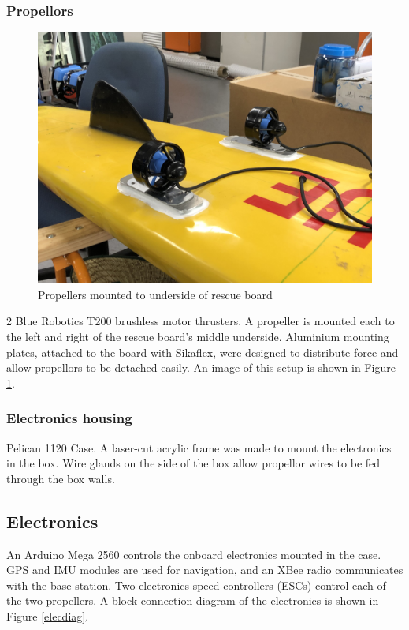 \documentclass[a4paper]{IEEEtran}
\begin{document}
\subsubsection{Propellors}
\begin{figure}[h!]
\includegraphics[width=\columnwidth]{motors-mounted.jpg}
\caption{Propellers mounted to underside of rescue board}
\label{propmount}
\end{figure}
2 Blue Robotics T200 brushless motor thrusters. A propeller is mounted each to the left and right of the rescue board's middle underside. Aluminium mounting plates, attached to the board with Sikaflex, were designed to distribute force and allow propellors to be detached easily. An image of this setup is shown in Figure \ref{propmount}.

\subsubsection{Electronics housing}
Pelican 1120 Case. A laser-cut acrylic frame was made to mount the electronics in the box. Wire glands on the side of the box allow propellor wires to be fed through the box walls.

\subsection{Electronics}
An Arduino Mega 2560 controls the onboard electronics mounted in the case. GPS and IMU modules are used for navigation, and an XBee radio communicates with the base station. Two electronics speed controllers (ESCs) control each of the two propellers. A block connection diagram of the electronics is shown in Figure \ref{elecdiag}.
\end{document}
